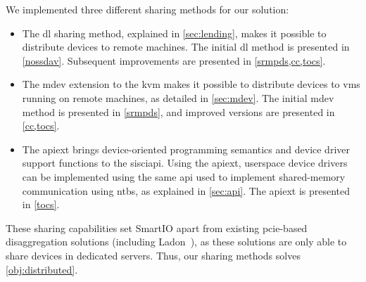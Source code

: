 We implemented three different sharing methods for our solution: 
%
\begin{itemize}
    \item The \gls{dl} sharing method, explained in \cref{sec:lending}, makes it possible to distribute devices to remote machines.
        The initial \gls{dl} method is presented in \cref{nossdav}. Subsequent improvements are presented in \cref{srmpds,cc,tocs}.



    \item The \gls{mdev} extension to the \gls{kvm} makes it possible to distribute devices to \glspl{vm} running on remote machines, as detailed in \cref{sec:mdev}.
        The initial \gls{mdev} method is presented in \cref{srmpds}, and improved versions are presented in \cref{cc,tocs}.



    \item The \gls{apiext} brings device-oriented programming semantics and device driver support functions to the \gls{sisciapi}.
        Using the \gls{apiext}, \gls{userspace} device drivers can be implemented using the same \gls{api} used to implement shared-memory communication using \glspl{ntb}, as explained in \cref{sec:api}.
        The \gls{apiext} is presented in \cref{tocs}.
\end{itemize}
%
These sharing capabilities set SmartIO apart from existing \gls{pcie}-based \gls{disaggregation} solutions (including Ladon~\cite{Tu2013}), as these solutions are only able to share devices in dedicated servers.
%
Thus, our sharing methods solves \cref*{obj:distributed}.





